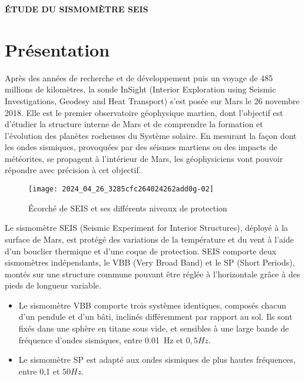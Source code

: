 
\begin{center}
\Large\textbf{\textsf{ÉTUDE DU SISMOMÈTRE SEIS}}
\normalsize
\end{center}

\section{Présentation}
\ifprof
\else
Après des années de recherche et de développement puis un voyage de 485 millions de kilomètres, la sonde InSight (Interior Exploration using Seismic Investigations, Geodesy and Heat Transport) s'est posée sur Mars le 26 novembre 2018. Elle est le premier observatoire géophysique martien, dont l'objectif est d'étudier la structure interne de Mars et de comprendre la formation et l'évolution des planètes rocheuses du Système solaire. En mesurant la façon dont les ondes sismiques, provoquées par des séismes martiens ou des impacts de météorites, se propagent à l'intérieur de Mars, les géophysiciens vont pouvoir répondre avec précision à cet objectif.

\begin{figure}[!h]
\centering
\texttt{[image: 2024\_04\_26\_3285cfc264024262add0g-02]}
\caption{\label{ccmp2023_fig_01}Écorché de SEIS et ses différents niveaux de protection}
\end{figure}

Le sismomètre SEIS (Seismic Experiment for Interior Structures), déployé à la surface de Mars, est protégé des variations de la température et du vent à l'aide d'un bouclier thermique et d'une coque de protection. SEIS comporte deux sismomètres indépendants, le VBB (Very Broad Band) et le SP (Short Periods), montés sur une structure commune pouvant être réglée à l'horizontale grâce à des pieds de longueur variable.

\begin{itemize}
  \item Le sismomètre VBB comporte trois systèmes identiques, composés chacun d'un pendule et d'un bâti, inclinés différemment par rapport au sol. Ils sont fixés dans une sphère en titane sous vide, et sensibles à une large bande de fréquence d'ondes sismiques, entre \SI{0,01}{Hz} et $0,5 \si{Hz}$.
  \item Le sismomètre SP est adapté aux ondes sismiques de plus hautes fréquences, entre 0,1 et $50 \si{Hz}$.
\end{itemize}

